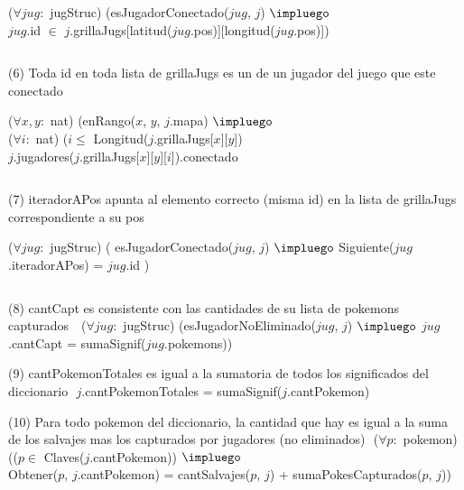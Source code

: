 \begin{Representacion}
($\forall jug:$ jugStruc) (esJugadorConectado($jug$, $j$) $\impluego$ \\
  $jug$.id $\in$ $j$.grillaJugs[latitud($jug$.pos)][longitud($jug$.pos)])
  
$ $\newline

(6) Toda id en toda lista de grillaJugs es un de un jugador del juego que este conectado  $ $\newline

($\forall x, y:$ nat) (enRango($x$, $y$, $j$.mapa) $\impluego$ \\
  ($\forall i:$ nat) ($i \leq$ Longitud($j$.grillaJugs[$x$][$y$]) \\
    $j$.jugadores($j$.grillaJugs[$x$][$y$][$i$]).conectado

$ $\newline

(7) iteradorAPos apunta al elemento correcto (misma id) en la lista de grillaJugs correspondiente a su pos $ $\newline

($\forall jug:$ jugStruc) ( esJugadorConectado($jug$, $j$) $\impluego$ Siguiente($jug$.iteradorAPos) = $jug$.id )

$ $\newline

(8) cantCapt es consistente con las cantidades de su lista de pokemons capturados $ $\newline
$ $\newline
($\forall jug:$ jugStruc) (esJugadorNoEliminado($jug$, $j$) $\impluego$ $jug$.cantCapt = sumaSignif($jug$.pokemons))
$ $\newline


(9) cantPokemonTotales es igual a la sumatoria de todos los significados del diccionario $ $\newline
$j$.cantPokemonTotales = sumaSignif($j$.cantPokemon)
$ $\newline

(10) Para todo pokemon del diccionario, la cantidad que hay es igual a la suma de los salvajes mas los capturados por jugadores (no eliminados) $ $\newline
($\forall p: $ pokemon) (($p \in$ Claves($j$.cantPokemon)) $\impluego$ \\
  Obtener($p$, $j$.cantPokemon) = cantSalvajes($p$, $j$) $+$ sumaPokesCapturados($p$, $j$))


\end{Representacion}
